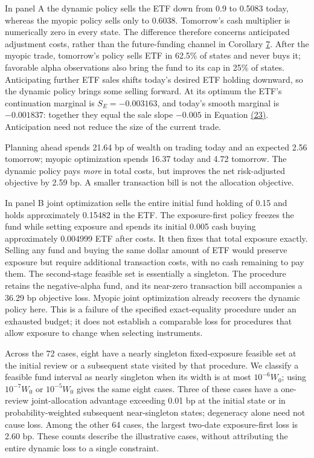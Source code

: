 \documentclass[11pt]{article}
\begin{document}
In panel A the dynamic policy sells the ETF down from 0.9 to 0.5083 today, whereas the myopic policy sells only to 0.6038. Tomorrow's cash multiplier is numerically zero in every state. The difference therefore concerns anticipated adjustment costs, rather than the future-funding channel in Corollary \hyperref[res:Corollary-7]{7}. After the myopic trade, tomorrow's policy sells ETF in 62.5\% of states and never buys it; favorable alpha observations also bring the fund to its cap in 25\% of states. Anticipating further ETF sales shifts today's desired ETF holding downward, so the dynamic policy brings some selling forward. At its optimum the ETF's continuation marginal is \(S_E=-0.003163\), and today's smooth marginal is \(-0.001837\): together they equal the sale slope \(-0.005\) in Equation \hyperref[eq:23]{(23)}. Anticipation need not reduce the size of the current trade.

Planning ahead spends 21.64 bp of wealth on trading today and an expected 2.56 tomorrow; myopic optimization spends 16.37 today and 4.72 tomorrow. The dynamic policy pays \emph{more} in total costs, but improves the net risk-adjusted objective by 2.59 bp. A smaller transaction bill is not the allocation objective.

In panel B joint optimization sells the entire initial fund holding of 0.15 and holds approximately 0.15482 in the ETF. The exposure-first policy freezes the fund while setting exposure and spends its initial 0.005 cash buying approximately 0.004999 ETF after costs. It then fixes that total exposure exactly. Selling any fund and buying the same dollar amount of ETF would preserve exposure but require additional transaction costs, with no cash remaining to pay them. The second-stage feasible set is essentially a singleton. The procedure retains the negative-alpha fund, and its near-zero transaction bill accompanies a 36.29 bp objective loss. Myopic joint optimization already recovers the dynamic policy here. This is a failure of the specified exact-equality procedure under an exhausted budget; it does not establish a comparable loss for procedures that allow exposure to change when selecting instruments.

Across the 72 cases, eight have a nearly singleton fixed-exposure feasible set at the initial review or a subsequent state visited by that procedure. We classify a feasible fund interval as nearly singleton when its width is at most \(10^{-6}W_0\); using \(10^{-7}W_0\) or \(10^{-5}W_0\) gives the same eight cases. Three of these cases have a one-review joint-allocation advantage exceeding 0.01 bp at the initial state or in probability-weighted subsequent near-singleton states; degeneracy alone need not cause loss. Among the other 64 cases, the largest two-date exposure-first loss is 2.60 bp. These counts describe the illustrative cases, without attributing the entire dynamic loss to a single constraint.
\end{document}
